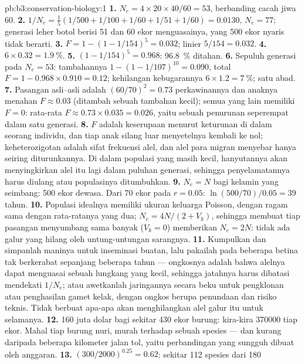 \begin{solution}{pb:b3:conservation-biology:1}
\textbf{1.} $N_{e} = 4\times 20\times 40/60 = 53$, berbanding cacah jiwa 60.
\textbf{2.} $1/N_{e} = \tfrac{1}{5}(1/500 + 1/100 + 1/60 + 1/51 + 1/60) =
0.0130$, $N_{e} = 77$; generasi leher botol berisi 51 dan 60 ekor
menguasainya, yang 500 ekor nyaris tidak berarti.
\textbf{3.} $F = 1 - (1 - 1/154)^{5} = 0.032$; linier $5/154 = 0.032$.
\textbf{4.} $6\times 0.32 = \qty{1.9}{\%}$.
\textbf{5.} $(1 - 1/154)^{5} = 0.968$: \qty{96.8}{\%} ditahan.
\textbf{6.} Sepuluh generasi pada $N_{e} = 53$: tambahannya $1 - (1 -
1/107)^{10} = 0.090$, total $F = 1 - 0.968\times 0.910 = 0.12$; kehilangan
kebugarannya $6\times 1.2 = \qty{7}{\%}$; satu abad.
\textbf{7.} Pasangan asli--asli adalah $(60/70)^{2} = 0.73$ perkawinannya
dan anaknya menahan $F \approx 0.03$ (ditambah sebuah tambahan kecil);
semua yang lain memiliki $F = 0$: rata-rata $F \approx 0.73\times 0.035 = 0.026$, yaitu sebuah penurunan
seperempat dalam satu generasi.
\textbf{8.} $F$ adalah keserupaan menurut keturunan di dalam seorang
individu, dan tiap anak silang luar menyetelnya kembali ke nol;
keheterozigotan adalah sifat frekuensi alel, dan alel para migran menyebar
hanya seiring diturunkannya. Di dalam populasi yang masih kecil,
hanyutannya akan menyingkirkan alel itu lagi dalam puluhan generasi,
sehingga penyelamatannya harus diulang atau populasinya ditumbuhkan.
\textbf{9.} $N_{e} = N$ bagi kelamin yang seimbang: 500 ekor dewasa. Dari 70 ekor pada $r =
0.05$: $\ln(500/70)/0.05 = 39$ tahun.
\textbf{10.} Populasi idealnya memiliki ukuran keluarga Poisson, dengan
ragam sama dengan rata-ratanya yang dua; $N_{e} = 4N/(2 + V_{k})$,
sehingga membuat tiap pasangan menyumbang sama banyak ($V_{k} = 0$)
memberikan $N_{e} = 2N$: tidak ada galur yang hilang oleh untung-untungan sarangnya.
\textbf{11.} Kumpulkan dan simpanlah maninya untuk inseminasi buatan, lalu
pakailah pada beberapa betina tak berkerabat sepanjang beberapa tahun ---
ongkosnya adalah bahwa alelnya dapat menguasai sebuah lungkang yang kecil,
sehingga jatahnya harus dibatasi mendekati $1/N_{e}$; atau awetkanlah
jaringannya secara beku untuk pengklonan atau penghasilan gamet kelak,
dengan ongkos berupa penundaan dan risiko teknis. Tidak berbuat apa-apa
akan menghilangkan alel galur itu untuk selamanya.
\textbf{12.} \qty{160}{} juta dolar bagi sekitar 430 ekor burung:
kira-kira \num{370000} tiap ekor. Mahal tiap burung nuri, murah terhadap
sebuah spesies --- dan kurang daripada beberapa kilometer jalan tol, yaitu
perbandingan yang sungguh dibuat oleh anggaran.
\textbf{13.} $(300/2000)^{0.25} = 0.62$: sekitar 112 spesies dari 180

\end{solution}
